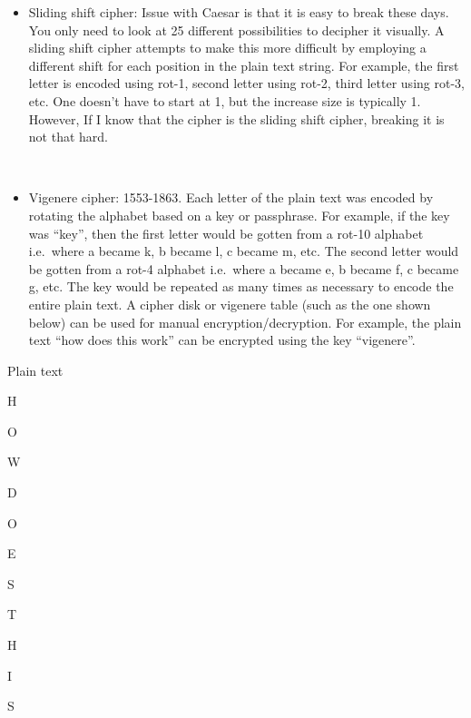 \documentclass[
  letterpaper,
  DIV=11,
  numbers=noendperiod]{scrartcl}
\newenvironment{Shaded}{\begin{snugshade}}{\end{snugshade}}
\newcommand{\NormalTok}[1]{\textcolor[rgb]{0.00,0.23,0.31}{#1}}
\providecommand{\tightlist}{%
  \setlength{\itemsep}{0pt}\setlength{\parskip}{0pt}}\usepackage{longtable,booktabs,array}
\begin{document}
\begin{Shaded}
\end{Shaded}

\begin{itemize}
\tightlist
\item
  Sliding shift cipher: Issue with Caesar is that it is easy to break
  these days. You only need to look at 25 different possibilities to
  decipher it visually. A sliding shift cipher attempts to make this
  more difficult by employing a different shift for each position in the
  plain text string. For example, the first letter is encoded using
  rot-1, second letter using rot-2, third letter using rot-3, etc. One
  doesn't have to start at 1, but the increase size is typically 1.
  However, If I know that the cipher is the sliding shift cipher,
  breaking it is not that hard.\\
  \strut \\
\item
  Vigenere cipher: 1553-1863. Each letter of the plain text was encoded
  by rotating the alphabet based on a key or passphrase. For example, if
  the key was ``key'', then the first letter would be gotten from a
  rot-10 alphabet i.e.~where a became k, b became l, c became m, etc.
  The second letter would be gotten from a rot-4 alphabet i.e.~where a
  became e, b became f, c became g, etc. The key would be repeated as
  many times as necessary to encode the entire plain text. A cipher disk
  or vigenere table (such as the one shown below) can be used for manual
  encryption/decryption. For example, the plain text ``how does this
  work'' can be encrypted using the key ``vigenere''.\\
\end{itemize}

Plain text

H

O

{W}

{D }

{O }

{E }

{S }

{T }

{H}

{I }

{S }
\end{document}
